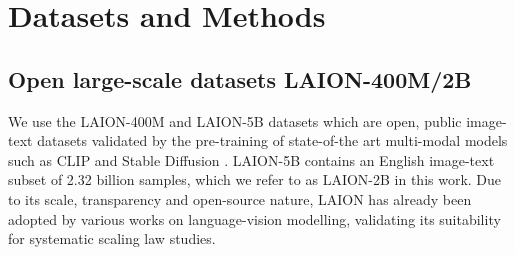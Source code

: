 \documentclass[11pt,table]{article}
\newcommand{\citep}{\cite}
\begin{document}


\section{Datasets and Methods} 
\label{sec:datasets_methods}

\subsection{Open large-scale datasets LAION-400M/2B} 
\label{subsect:pretrain_laion}

We use the LAION-400M \citep{schuhmann2021laion} and LAION-5B \citep{Schuhmann2022} datasets which are open, public image-text datasets validated by the pre-training of state-of-the art multi-modal models such as CLIP \citep{radford2021learning} and Stable Diffusion \citep{rombach2021highresolution}. LAION-5B contains an English image-text subset of 2.32 billion samples, which we refer to as LAION-2B in this work.  Due to its scale, transparency and open-source nature, LAION has already been adopted by various works on language-vision modelling, validating its suitability for systematic scaling law studies. 
\end{document}
